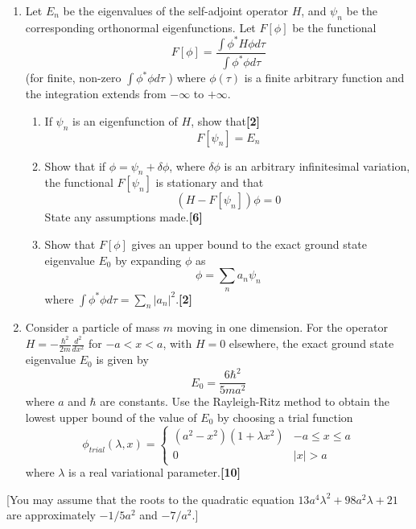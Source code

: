 \documentclass[a4paper]{article}
\begin{document}
\begin{qns}\leavevmode
\begin{enumerate}[label=(\alph*)]
\item Let $E_n$ be the eigenvalues of the self-adjoint operator $H$, and $\psi_n$ be the corresponding orthonormal eigenfunctions. Let $F[\phi]$ be the functional
$$F[\phi]=\frac{\int\phi^*H\phi d\tau}{\int \phi^*\phi d\tau}$$
(for finite, non-zero $\int\phi^*\phi d\tau$ ) where $\phi(\tau)$ is a finite arbitrary function and the integration extends from $-\infty$ to $+\infty$.
\begin{enumerate}[label=(\roman*)]
\item If $\psi_n$ is an eigenfunction of $H$, show that\hfill\textbf{[2]}
$$F[\psi_n]=E_n$$
\item Show that if $\phi=\psi_n+\delta\phi$, where $\delta\phi$ is an arbitrary infinitesimal variation, the functional $F[\psi_n]$ is stationary and that
$$(H − F[\psi_n])\phi= 0$$
State any assumptions made.\hfill\textbf{[6]}
\item Show that $F[\phi]$ gives an upper bound to the exact ground state eigenvalue $E_0$ by expanding $\phi$ as
$$\phi=\sum_na_n\psi_n$$
where $\int\phi^*\phi d\tau=\sum_n|a_n|^2$.\hfill\textbf{[2]}
\end{enumerate}
\item Consider a particle of mass $m$ moving in one dimension. For the operator $H =-\frac{\hbar^2}{2m}\frac{d^2}{dx^2}$ for $-a<x<a$, with $H = 0$ elsewhere, the exact ground state eigenvalue $E_0$ is given by
$$E_0=\frac{6\hbar^2}{5ma^2}$$
where $a$ and $\hbar$ are constants. Use the Rayleigh-Ritz method to obtain the lowest upper bound of the value of $E_0$ by choosing a trial function
$$\phi_{trial}(\lambda,x)=
\left\{
        \begin{array}{ll}
      (a^2-x^2)(1+\lambda x^2) & -a\leq x\leq a \\
      0 & |x|>a
        \end{array}
    \right.$$
where $\lambda$ is a real variational parameter.\hfill\textbf{[10]}
\end{enumerate}
[You may assume that the roots to the quadratic equation $13a^4\lambda^2+98a^2\lambda+21$ are approximately $−1/5a^2$ and $−7/a^2$.]
\end{qns}
\newpage
\end{document}
